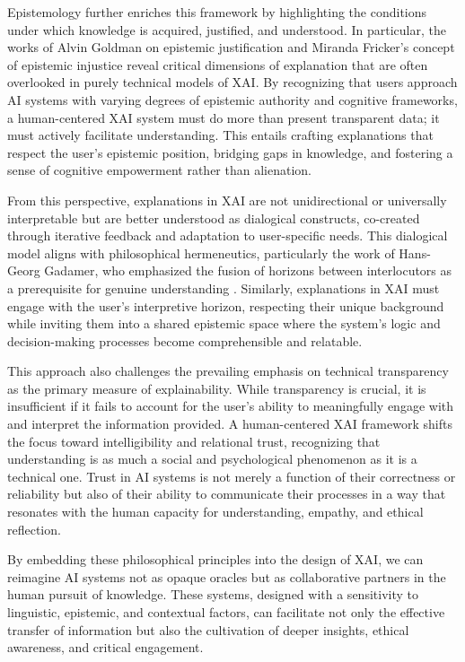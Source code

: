 \documentclass[times, twoside, watermark]{zHenriquesLab-StyleBioRxiv}
\begin{document}
Epistemology further enriches this framework by highlighting the conditions under which knowledge is acquired, justified, and understood. In particular, the works of Alvin Goldman on epistemic justification \cite{goldman1986epistemology} and Miranda Fricker’s concept of epistemic injustice \cite{fricker2007epistemic}
reveal critical dimensions of explanation that are often overlooked in purely technical models of XAI. By recognizing that users approach AI systems with varying degrees of epistemic authority and cognitive frameworks, a human-centered XAI system must do more than present transparent data; it must actively facilitate understanding. This entails crafting explanations that respect the user's epistemic position, bridging gaps in knowledge, and fostering a sense of cognitive empowerment rather than alienation.

From this perspective, explanations in XAI are not unidirectional or universally interpretable but are better understood as dialogical constructs, co-created through iterative feedback and adaptation to user-specific needs. This dialogical model aligns with philosophical hermeneutics, particularly the work of Hans-Georg Gadamer, who emphasized the fusion of horizons between interlocutors as a prerequisite for genuine understanding \cite{gadamer1975truth}. Similarly, explanations in XAI must engage with the user’s interpretive horizon, respecting their unique background while inviting them into a shared epistemic space where the system’s logic and decision-making processes become comprehensible and relatable.

This approach also challenges the prevailing emphasis on technical transparency as the primary measure of explainability. While transparency is crucial, it is insufficient if it fails to account for the user's ability to meaningfully engage with and interpret the information provided. A human-centered XAI framework shifts the focus toward intelligibility and relational trust, recognizing that understanding is as much a social and psychological phenomenon as it is a technical one. Trust in AI systems is not merely a function of their correctness or reliability but also of their ability to communicate their processes in a way that resonates with the human capacity for understanding, empathy, and ethical reflection.

By embedding these philosophical principles into the design of XAI, we can reimagine AI systems not as opaque oracles but as collaborative partners in the human pursuit of knowledge. These systems, designed with a sensitivity to linguistic, epistemic, and contextual factors, can facilitate not only the effective transfer of information but also the cultivation of deeper insights, ethical awareness, and critical engagement. 
\end{document}
